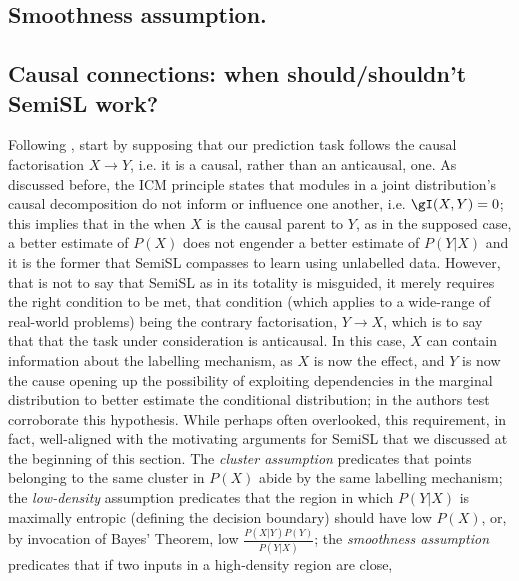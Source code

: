 \subsection{Smoothness assumption.}\label{ssec:smoothness-assumption}
\subsection{
  Causal connections: when should/shouldn't SemiSL work?
}\label{ssec:semisl-causality}

Following \cite{scholkopf2021toward}, start by supposing that our prediction task follows the
causal factorisation \( X \to Y\), i.e. it is a causal, rather than an anticausal, one.
%
As discussed before, the ICM principle states that modules in a joint distribution's causal
decomposition do not inform or influence one another, i.e. \(\gI(X, Y) = 0 \); this implies that in
the when \(X\) is the causal parent to \(Y\), as in the supposed case, a better estimate of
\(P(X)\) does not engender a better estimate of \(P(Y|X)\) and it is the former that SemiSL
compasses to learn using unlabelled data.
%
However, that is not to say that SemiSL as in its totality is misguided, it merely requires the
right condition to be met, that condition (which applies to a wide-range of real-world problems)
being the contrary factorisation, \(Y \to X \), which is to say that that the task under
consideration is anticausal.
%
In this case, \(X\) can contain information about the labelling mechanism, as \(X\) is now the
effect, and \(Y\) is now the cause opening up the possibility of exploiting dependencies in the
marginal distribution to better estimate the conditional distribution; in
\cite{scholkopf2012causal} the authors test corroborate this hypothesis.
%
While perhaps often overlooked, this requirement, in fact, well-aligned with the motivating
arguments for SemiSL that we discussed at the beginning of this section.
%
The \emph{cluster assumption} predicates that points belonging to the same cluster in \(P(X)\)
abide by the same labelling mechanism; 
%
the \emph{low-density} assumption predicates that the region in which \(P(Y|X)\) is maximally
entropic (defining the decision boundary) should have low \(P(X)\), or, by invocation of Bayes'
Theorem, low \( \frac{ P(X|Y)P(Y) }{ P(Y|X) } \); 
%
the \emph{smoothness assumption} predicates that if two inputs in a high-density region are close,

